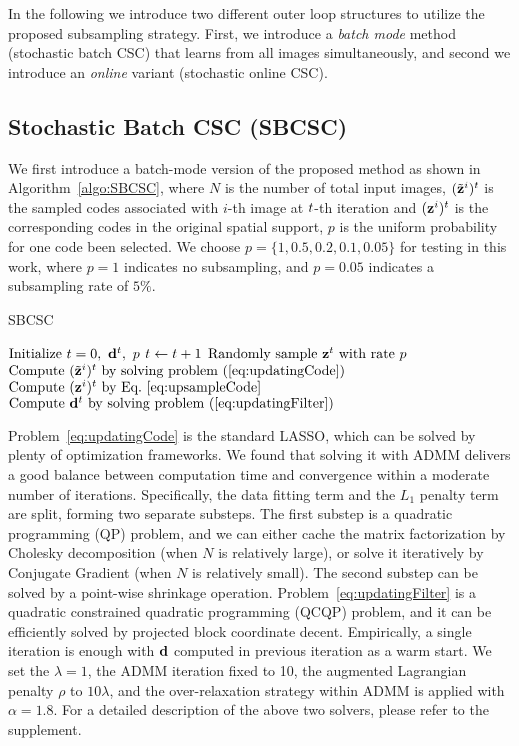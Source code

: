In the following we introduce two different outer loop structures to
utilize the proposed subsampling strategy. First, we introduce a {\em
  batch mode} method (stochastic batch CSC) that learns from all
images simultaneously, and second we introduce an {\em online}
variant (stochastic online CSC).

\subsection{Stochastic Batch CSC (SBCSC)}
We first introduce a batch-mode version of the proposed method as
shown in Algorithm~\ref{algo:SBCSC}, where $N$ is the number of total
input images, $(\subcode^i)^{\ite}$ is the sampled codes associated with $i$-th
image at $t$-th iteration and $(\code^i)^{\ite}$ is the corresponding codes in the original spatial support, $p$ is the uniform probability for one code been
selected. We choose $p=\{1, 0.5, 0.2, 0.1, 0.05\}$ for testing in this
work, where $p=1$ indicates no subsampling, and $p=0.05$ indicates a
subsampling rate of $5\%$.

\begin{algorithm}[H]
\caption{SBCSC} \label{algo:SBCSC}
\begin{algorithmic}[1]
\State $\text{Initialize}  ~ \ite=0, ~\filter^t, ~p$
    \State $t \gets t+1$
    \State $ \text{Randomly sample }\code^{\ite} \text{ with rate } p $
        \State $ \text{Compute } (\subcode^i)^{\ite} \text{ by solving problem~(\ref{eq:updatingCode}})$
        \State $ \text{Compute } (\code^i)^{\ite}   \text{ by Eq.~\ref{eq:upsampleCode}}$
    \EndFor
    \State $\text{Compute } \filter^{\ite} \text{ by solving problem~(\ref{eq:updatingFilter}})$
\EndWhile
\end{algorithmic}
\end{algorithm}

Problem~\eqref{eq:updatingCode} is the standard LASSO, which can be
solved by plenty of optimization frameworks. We found that solving it
with ADMM delivers a good balance between computation time and
convergence within a moderate number of iterations. Specifically, the
data fitting term and the $L_1$ penalty term are split, forming two
separate substeps. The first substep is a quadratic programming (QP)
problem, and we can either cache the matrix factorization by Cholesky
decomposition (when $N$ is relatively large), or solve it iteratively
by Conjugate Gradient (when $N$ is relatively small). The second
substep can be solved by a point-wise shrinkage operation.
Problem~\eqref{eq:updatingFilter} is a quadratic constrained
quadratic programming (QCQP) problem, and it can be efficiently solved
by projected block coordinate decent. Empirically, a single iteration
is enough with $\filter$ computed in previous iteration as a warm
start. We set the  $\lambda=1$, the ADMM iteration
fixed to 10, the augmented Lagrangian penalty $\rho$ to $10 \lambda$,
and the over-relaxation strategy within ADMM is applied with $\alpha =
1.8$. For a detailed description of the above two solvers, please
refer to the supplement.

